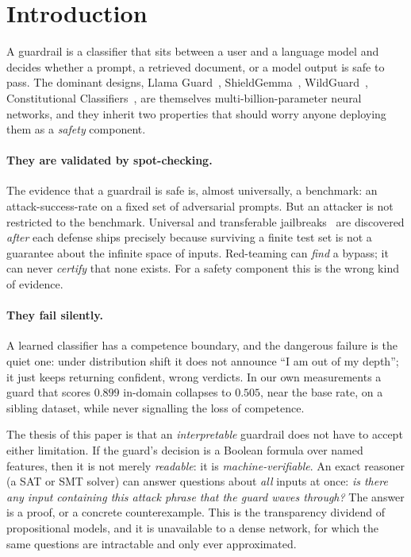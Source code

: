 \documentclass[11pt]{article}
\newcommand{\plainIn}{0.899}\newcommand{\plainOut}{0.505}
\begin{document}
\section{Introduction}

A guardrail is a classifier that sits between a user and a language model and
decides whether a prompt, a retrieved document, or a model output is safe to pass.
The dominant designs, Llama Guard~\citep{inan2023llamaguard},
ShieldGemma~\citep{zeng2024shieldgemma}, WildGuard~\citep{han2024wildguard},
Constitutional Classifiers~\citep{sharma2025constitutional}, are themselves
multi-billion-parameter neural networks, and they inherit two properties that
should worry anyone deploying them as a \emph{safety} component.

\paragraph{They are validated by spot-checking.} The evidence that a guardrail is
safe is, almost universally, a benchmark: an attack-success-rate on a fixed set of
adversarial prompts. But an attacker is not restricted to the benchmark. Universal
and transferable jailbreaks~\citep{zou2023universal} are discovered \emph{after}
each defense ships precisely because surviving a finite test set is not a guarantee
about the infinite space of inputs. Red-teaming can \emph{find} a bypass; it can
never \emph{certify} that none exists. For a safety component this is the wrong
kind of evidence.

\paragraph{They fail silently.} A learned classifier has a competence boundary,
and the dangerous failure is the quiet one: under distribution shift it does not
announce ``I am out of my depth''; it just keeps returning confident, wrong
verdicts. In our own measurements a guard that scores $\plainIn$ in-domain
collapses to $\plainOut$, near the base rate, on a sibling dataset, while never
signalling the loss of competence.

The thesis of this paper is that an \emph{interpretable} guardrail does not have to
accept either limitation. If the guard's decision is a Boolean formula over named
features, then it is not merely \emph{readable}: it is \emph{machine-verifiable}.
An exact reasoner (a SAT or SMT solver) can answer questions about \emph{all}
inputs at once: \emph{is there any input containing this attack phrase that the
guard waves through?} The answer is a proof, or a concrete counterexample. This is
the transparency dividend of propositional models, and it is unavailable to a dense
network, for which the same questions are intractable and only ever approximated.
\end{document}
